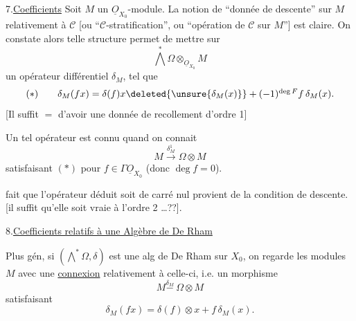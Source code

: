 7.\quad \uline{Coefficients}  Soit $M$ un $\underline O_{X_0}$-module. La notion de ``donnée de descente'' sur $M$ relativement à $\mathcal C$ [ou ``$\mathcal C$-stratification'', ou ``opération de $\mathcal C$ sur $M$''] est claire. On constate alors  telle structure permet de mettre sur
\[
\bigwedge^*\Omega\otimes_{\underline O_{X_0}}M
\]
un opérateur différentiel $\delta_M$, tel que
\[
\begin{array}{l@{\qquad}l}
(*)&\delta_M(fx)=\delta(f)x\deleted{\unsure{\delta_M(x)}}+(-1)^{\deg F}f\,\delta_M(x).
\end{array}
\]
[Il suffit $=$ d'avoir une donnée de recollement d'ordre 1]

Un tel opérateur est connu quand on connait
\[
M\xrightarrow{\delta_M^1}\Omega\otimes M
\]
satisfaisant $(*)$  pour $f\in\Gamma\underline O_{X_0}$ (donc $\deg f=0$).

 fait que l'opérateur déduit  soit de carré nul provient de la condition de descente. [il suffit qu'elle soit vraie à l'ordre 2 \ldots??].

8.\quad \uline{Coefficients relatifs à une Algèbre de De Rham}

Plus gén, si $(\bigwedge^*\Omega,\delta)$ est une alg de De Rham sur $X_0$, on  regarde les modules $M$ avec une \uline{connexion} relativement à celle-ci, i.e. un morphisme
\[
M\overset{\delta_M}{\mathbin{-}}\ \Omega\otimes M
\]
satisfaisant
\[
\delta_M(fx)=\delta(f)\otimes x+f\,\delta_M(x).
\]

